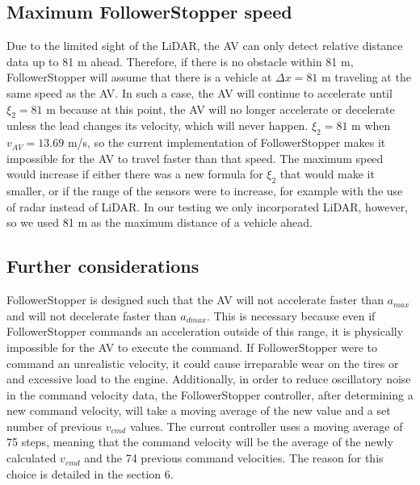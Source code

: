 \documentclass[conference]{IEEEtran}
\begin{document}
\subsection{Maximum FollowerStopper speed}
Due to the limited sight of the LiDAR, the AV can only detect relative distance data up to 81 m ahead. Therefore, if there is no obstacle within 81 m, FollowerStopper will assume that there is a vehicle at $\Delta x=81$ m traveling at the same speed as the AV. In such a case, the AV will continue to accelerate until $\xi_2=81$ m because at this point, the AV will no longer accelerate or decelerate unless the lead changes its velocity, which will never happen. $\xi_2=81$ m when $v_{AV}=13.69$ m/s, so the current implementation of FollowerStopper makes it impossible for the AV to travel faster than that speed. The maximum speed would increase if either there was a new formula for $\xi_2$ that would make it smaller, or if the range of the sensors were to increase, for example with the use of radar instead of LiDAR. In our testing we only incorporated LiDAR, however, so we used 81 m as the maximum distance of a vehicle ahead.

\subsection{Further considerations}
FollowerStopper is designed such that the AV will not accelerate faster than $a_{max}$ and will not decelerate faster than $a_{dmax}$. This is necessary because even if FollowerStopper commands an acceleration outside of this range, it is physically impossible for the AV to execute the command. If FollowerStopper were to command an unrealistic velocity, it could cause irreparable wear on the tires or and excessive load to the engine. Additionally, in order to reduce oscillatory noise in the command velocity data, the FollowerStopper controller, after determining a new command velocity, will take a moving average of the new value and a set number of previous $v_{cmd}$ values. The current controller uses a moving average of 75 steps, meaning that the command velocity will be the average of the newly calculated $v_{cmd}$ and the 74 previous command velocities. The reason for this choice is detailed in the section 6.



\end{document}
